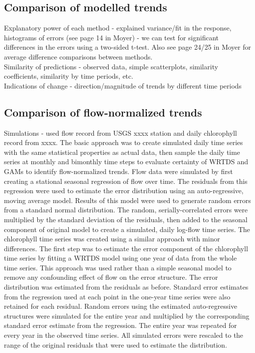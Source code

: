 \documentclass[letterpaper,12pt,oneside]{article}\usepackage[]{graphicx}\usepackage[]{color}
\begin{document}
\subsection{Comparison of modelled trends}

Explanatory power of each method - explained variance/fit in the response, histograms of errors (see page 14 in Moyer) - we can test for significant differences in the errors using a two-sided t-test.  Also see page 24/25 in Moyer for average difference comparisons between methods. \\
Similarity of predictions - observed data, simple scatterplots, similarity coefficients, similarity by time periods, etc.\\
Indications of change - direction/magnitude of trends by different time periods

\subsection{Comparison of flow-normalized trends}

Simulations - used flow record from USGS xxxx station and daily chlorophyll record from xxxx.  The basic approach was to create simulated daily time series with the same statistical properties as actual data, then sample the daily time series at monthly and bimonthly time steps to evaluate certainty of WRTDS and GAMs to identify flow-normalized trends.  Flow data were simulated by first creating a stational seasonal regression of flow over time.  The residuals from this regression were used to estimate the error distribution using an auto-regressive, moving average model.  Results of this model were used to generate random errors from a standard normal distribution.  The random, serially-correlated errors were multiplied by the standard deviation of the residuals, then added to the seasonal component of original model to create a simulated, daily log-flow time series.  The chlorophyll time series was created using a similar approach with minor differences.  The first step was to estimate the error component of the chlorophyll time series by fitting a \ac{WRTDS} model using one year of data from the whole time series.  This approach was used rather than a simple seasonal model to remove any confounding effect of flow on the error structure.  The error distribution was estimated from the residuals as before.  Standard error estimates from the regression used at each point in the one-year time series were also retained for each residual.  Random errors using the estimated auto-regressive structures were simulated for the entire year and multiplied by the corresponding standard error estimate from the regression.  The entire year was repeated for every year in the observed time series.  All simulated errors were rescaled to the range of the original residuals that were used to estimate the distribution.  
\end{document}
